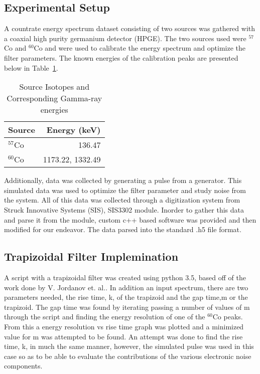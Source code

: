 \subsection{Experimental Setup}
A countrate energy spectrum dataset consisting of two sources was gathered with a coaxial high purity germanium detector (HPGE). 
The two sources used were  $^{57}$Co and $^{60}$Co and were used to calibrate the energy spectrum and optimize the filter parameters. The known energies of the calibration peaks are presented below in Table~\ref{tab:CalSrc}.

\begin{table}[H]
        \begin{center}
                \begin{tabular}{l|r}
                        \textbf{Source} & \textbf{Energy (keV)}\\
                        \hline
                        $^{57}$Co      &       136.47    \\
                        $^{60}$Co      &       1173.22, 1332.49   \\
                \end{tabular}
		\caption{Source Isotopes and Corresponding Gamma-ray energies\cite{nndc}}
                \label{tab:CalSrc}
        \end{center}
\end{table}

Additionally, data was collected by generating a pulse from a generator. This simulated data was used to optimize the filter parameter and study noise from the system. 
All of this data was collected through a digitization system from Struck Innovative Systems (SIS), SIS3302 module. Inorder to gather this data and parse it from the module,
custom c++ based software was provided and then modified for our endeavor. The data parsed into the standard .h5 file format. 

\subsection{Trapizoidal Filter Implemination}
	
	A script with a trapizoidal filter  was created using python 3.5, based off of the work done by V. Jordanov et. al.\cite{jordanov1994digital}. In addition an input spectrum, there are two parameters needed,
	the rise time, k, of the trapizoid and the gap time,m or the trapizoid. The gap time was found by iterating passing a number of values of m through the script and finding the energy resolution of one of the  $^{60}$Co peaks. From this a energy resolution vs rise time graph was plotted and a minimized value for m was attempted to be found. An attempt was done to find the rise time, k, in much the same manner, however, the simulated pulse was used in this case so as to be able to evaluate the contributions of the various electronic noise components. 

